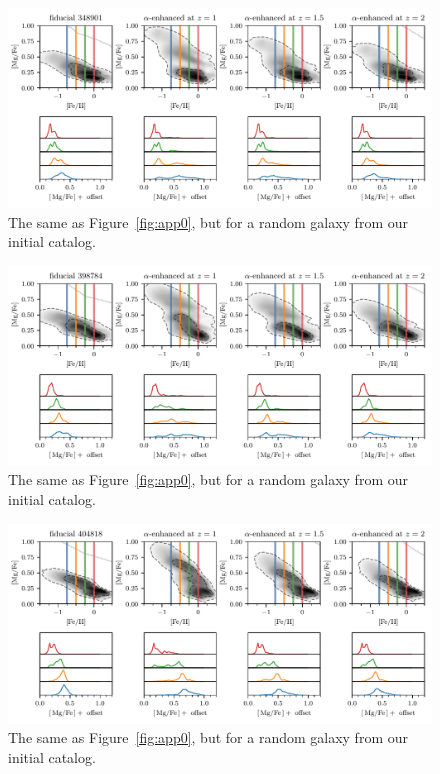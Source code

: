 \begin{appendices}
\begin{figure}
  \centering
  \includegraphics[width=\textwidth]{ch4/app_348901.pdf}
  \caption{The same as Figure~\ref{fig:app0}, but for a random galaxy from our initial catalog.}
  \label{fig:app7}
\end{figure}

\begin{figure}
  \centering
  \includegraphics[width=\textwidth]{ch4/app_398784.pdf}
  \caption{The same as Figure~\ref{fig:app0}, but for a random galaxy from our initial catalog.}
  \label{fig:app8}
\end{figure}

\begin{figure}
  \centering
  \includegraphics[width=\textwidth]{ch4/app_404818.pdf}
  \caption{The same as Figure~\ref{fig:app0}, but for a random galaxy from our initial catalog.}
  \label{fig:app9}
\end{figure}


\end{appendices}
